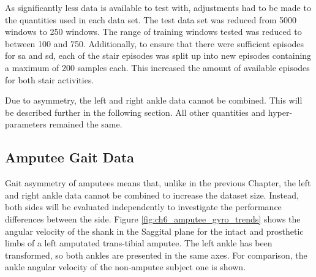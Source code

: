 As significantly less data is available to test with, adjustments had to be made to the quantities used in each data set. The test data set was reduced from 5000 windows to 250 windows. The range of training windows tested was reduced to between 100 and 750. Additionally, to ensure that there were sufficient episodes for \acrshort{sa} and \acrshort{sd}, each of the stair episodes was split up into new episodes containing a maximum of 200 samples each. This increased the amount of available episodes for both stair activities.

Due to asymmetry, the left and right ankle data cannot be combined. This will be described further in the following section. All other quantities and hyper-parameters remained the same.

\subsection{Amputee Gait Data}
Gait asymmetry of amputees means that, unlike in the previous Chapter, the left and right ankle data cannot be combined to increase the dataset size. Instead, both sides will be evaluated independently to investigate the performance differences between the side. Figure \ref{fig:ch6_amputee_gyro_trends} shows the angular velocity of the shank in the Saggital plane for the intact and prosthetic limbs of a left amputated trans-tibial amputee. The left ankle has been transformed, so both ankles are presented in the same axes. For comparison, the ankle angular velocity of the non-amputee subject one is shown.


